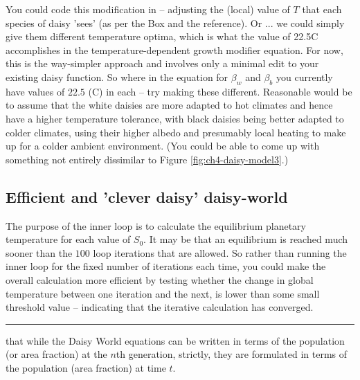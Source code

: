 \documentclass{tufte-book} %
\begin{document}
You could code this modification in -- adjusting the (local) value of \(T\) that each species of daisy 'sees' (as per the Box and the reference). Or ... we could simply give them different temperature optima, which is what the value of 22.5\degree C accomplishes in the temperature-dependent growth modifier equation. For now, this is the way-simpler approach and involves only a minimal edit to your existing daisy function. So where in the equation for \(\beta_{w}\) and \(\beta_{b}\) you currently have values of \(22.5\) (\degree  C) in each -- try making these different. Reasonable would be to assume that the white daisies are more adapted to hot climates and hence have a higher temperature tolerance, with black daisies being better adapted to colder climates, using their higher albedo and presumably local heating to make up for a colder ambient environment. (You could be able to come up with something not entirely dissimilar to Figure \ref{fig:ch4-daisy-model3}.)


\subsection{Efficient and 'clever daisy' daisy-world}

The purpose of the inner loop is to calculate the equilibrium planetary temperature for each value of \(S_{0}\). It may be that an equilibrium is reached much sooner than the \(100\) loop iterations that are allowed. So rather than running the inner loop for the fixed number of iterations each time, you could make the overall calculation more efficient by testing whether the change in global temperature between one iteration and the next, is lower than some small threshold value -- indicating that the iterative calculation has converged.

\noindent\rule[0.0ex]{0.5\linewidth}{0.5pt}

 that while the Daisy World equations can be written in terms of the population (or area fraction) at the \(n\)th generation, strictly, they are formulated in terms of the population (area fraction) at time \(t\).
\end{document}
